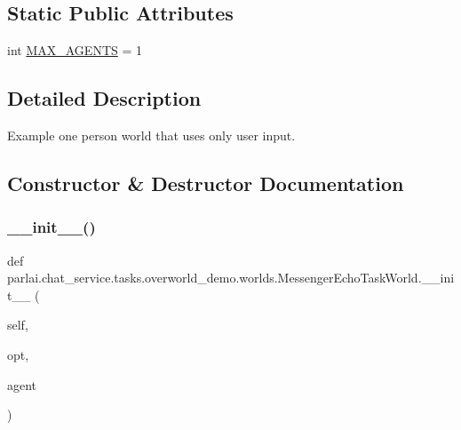 \subsection*{Static Public Attributes}
\begin{DoxyCompactItemize}
\item 
int \hyperlink{classparlai_1_1chat__service_1_1tasks_1_1overworld__demo_1_1worlds_1_1MessengerEchoTaskWorld_a2bf81ef856313f96749fd0dbd7049582}{M\+A\+X\+\_\+\+A\+G\+E\+N\+TS} = 1
\end{DoxyCompactItemize}


\subsection{Detailed Description}
\begin{DoxyVerb}Example one person world that uses only user input.
\end{DoxyVerb}
 

\subsection{Constructor \& Destructor Documentation}
\mbox{\label{classparlai_1_1chat__service_1_1tasks_1_1overworld__demo_1_1worlds_1_1MessengerEchoTaskWorld_aea9e37c8acd753234d74bbd6bde07870}} 
\subsubsection{\texorpdfstring{\+\_\+\+\_\+init\+\_\+\+\_\+()}{\_\_init\_\_()}}
{\footnotesize\ttfamily def parlai.\+chat\+\_\+service.\+tasks.\+overworld\+\_\+demo.\+worlds.\+Messenger\+Echo\+Task\+World.\+\_\+\+\_\+init\+\_\+\+\_\+ (\begin{DoxyParamCaption}\item[{}]{self,  }\item[{}]{opt,  }\item[{}]{agent }\end{DoxyParamCaption})}



